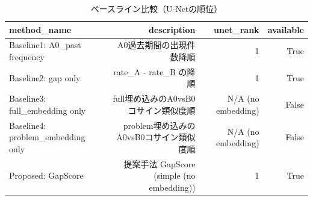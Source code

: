 \begin{table}[htbp]
  \centering
  \caption{ベースライン比較（U-Netの順位）}
  \label{tab:baseline}
  \begin{tabular}{lrrr}
    \hline
    method\_name & description & unet\_rank & available \\
    \hline
    Baseline1: A0\_past frequency & A0過去期間の出現件数降順 & 1 & True \\
    Baseline2: gap only & rate\_A - rate\_B の降順 & 1 & True \\
    Baseline3: full\_embedding only & full埋め込みのA0vsB0コサイン類似度順 & N/A (no embedding) & False \\
    Baseline4: problem\_embedding only & problem埋め込みのA0vsB0コサイン類似度順 & N/A (no embedding) & False \\
    Proposed: GapScore & 提案手法 GapScore (simple (no embedding)) & 1 & True \\
    \hline
  \end{tabular}
\end{table}
